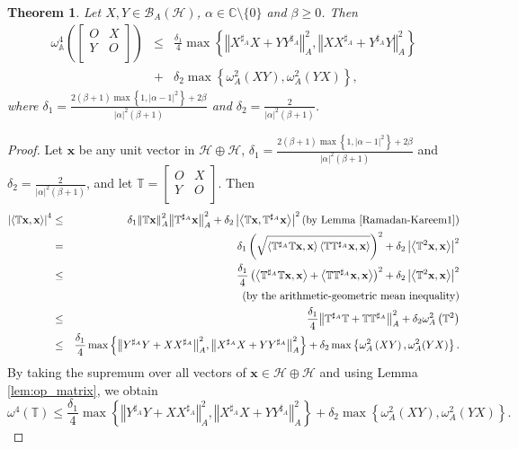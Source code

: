 \documentclass{article}
\newcommand{\bra}[1]{\left(#1\right)}
\newcommand{\seq}[1]{\left<#1\right>}
\newcommand{\normA}[1]{{\left\Vert#1\right\Vert}_{A}}
\newcommand{\abs}[1]{\left\vert#1\right\vert}
\newcommand{\set}[1]{\left\{#1\right\}}
\renewcommand{\c}{\mathbb C}
\newcommand {\A}{\mathbb{A}}
\newcommand {\T}{\mathbb{T}}
\newcommand {\h}{\mathcal{H}}
\newcommand {\Ta}{\mathbb{T}^{\sharp_{A}}}
\newcommand {\Xa}{X^{\sharp_{A}}}
\renewcommand {\b}{\mathcal{B}}
\newcommand {\Ya}{Y^{\sharp_{A}}}
\newtheorem{theorem}{Theorem}[section]
\begin{document}
\begin{theorem}\label{MOBY-A1} Let $X,Y\in\b_A(\h)$, $\alpha\in\c\setminus\{0\}$ and $\beta\geq 0$. Then
\begin{eqnarray}\label{Ram-K1}
  \omega_{\A}^4\bra{\begin{bmatrix} O& X\\ Y& O \\\end{bmatrix}}&\leq&\frac{\delta_1}{4}\max\set{\normA{\Xa X+Y\Ya}^2,\normA{X\Xa +\Ya Y}^2}\nonumber\\
  &+&\delta_2\max\set{\omega_A^2\bra{XY},\omega_A^2(YX)},
\end{eqnarray}
 where $\delta_1=\frac{2(\beta+1)\max\set{1,\abs{\alpha-1}^2}+2\beta}{\abs{\alpha}^2(\beta+1)}$ and $\delta_2=\frac{2}{\abs{\alpha}^2(\beta+1)}$.
\end{theorem}
\begin{proof}Let $\mathbf{x}$ be any unit vector in $\h\oplus\h$, $\delta_1=\frac{2(\beta+1)\max\set{1,\abs{\alpha-1}^2}+2\beta}{\abs{\alpha}^2(\beta+1)}$ and $\delta_2=\frac{2}{\abs{\alpha}^2(\beta+1)}$,  and let $\T=\begin{bmatrix} O& X\\ Y& O \\\end{bmatrix}$. Then
  \begin{eqnarray*}
    \abs{\seq{\T\mathbf{x},\mathbf{x}}}^4 &\leq&\delta_1\normA{\T\mathbf{x}}^2\normA{\Ta\mathbf{x}}^2+\delta_2\abs{\seq{\T\mathbf{x},\Ta\mathbf{x}}}^2 \bra{\mbox{by Lemma \ref{Ramadan-Kareem1}}}\\
     &=&\delta_1\bra{\sqrt{\seq{\Ta \T\mathbf{x},\mathbf{x}}\seq{\T\Ta\mathbf{x},\mathbf{x}}}}^2+\delta_2\abs{\seq{\T^2\mathbf{x},\mathbf{x}}}^2\\
     &\leq& \frac{\delta_1}{4}\bra{\seq{\Ta \T\mathbf{x},\mathbf{x}}+\seq{\T\Ta\mathbf{x},\mathbf{x}}}^2+\delta_2\abs{\seq{\T^2\mathbf{x},\mathbf{x}}}^2\\
     &&\bra{\mbox{by the arithmetic-geometric mean inequality}}\\
     &\leq& \frac{\delta_1}{4}\normA{\Ta \T+\T\Ta}^2+\delta_2\omega_A^2\bra{\T^2}\\
     &\leq& \frac{\delta_1}{4}\max\set{\normA{\Ya Y+X\Xa}^2,\normA{\Xa X+Y\Ya}^2}+\delta_2\max\set{\omega_A^2\bra{XY},\omega_A^2(YX)}.
  \end{eqnarray*}
  By taking the supremum over all vectors of $\mathbf{x}\in\h\oplus\h$ and using Lemma \ref{lem:op_matrix}, we obtain
  $$\omega^4(\T)\leq \frac{\delta_1}{4}\max\set{\normA{\Ya Y+X\Xa}^2,\normA{\Xa X+Y\Ya}^2}+\delta_2\max\set{\omega_A^2\bra{XY},\omega_A^2(YX)}.$$
\end{proof}
\end{document}
